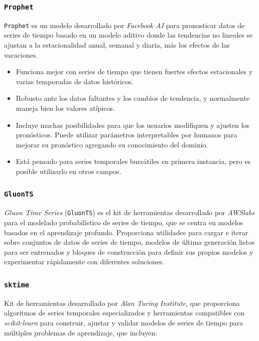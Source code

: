 \documentclass[a4paper,12pt]{article}
\begin{document}
\subsubsection{\texttt{Prophet}}
\texttt{Prophet} es un modelo desarrollado por \textit{Facebook AI} para pronosticar datos de series de tiempo basado en un modelo aditivo donde las tendencias no lineales se ajustan a la estacionalidad anual, semanal y diaria, más los efectos de las vacaciones. \citep{prophet}

\begin{itemize}
	\item Funciona mejor con series de tiempo que tienen fuertes efectos estacionales y varias temporadas de datos históricos.
	\item Robusto ante los datos faltantes y los cambios de tendencia, y normalmente maneja bien los valores atípicos.
	\item Incluye muchas posibilidades para que los usuarios modifiquen y ajusten los pronósticos. Puede utilizar parámetros interpretables por humanos para mejorar su pronóstico agregando su conocimiento del dominio.
	\item Está pensado para series temporales bursátiles en primera instancia, pero es posible utilizarlo en otros campos.
\end{itemize}

\subsubsection{\texttt{GluonTS}}
\textit{Gluon Time Series} (\texttt{GluonTS}) es el kit de herramientas desarrollado por \textit{AWSlabs} para el modelado probabilístico de series de tiempo, que se centra en modelos basados ​​en el aprendizaje profundo. Proporciona utilidades para cargar e iterar sobre conjuntos de datos de series de tiempo, modelos de última generación listos para ser entrenados y bloques de construcción para definir sus propios modelos y experimentar rápidamente con diferentes soluciones. \citep{gluonts}

\subsubsection{\texttt{sktime}}
Kit de herramientas desarrollado por \textit{Alan Turing Institute}, que proporciona algoritmos de series temporales especializados y herramientas compatibles con \textit{scikit-learn} para construir, ajustar y validar modelos de series de tiempo para múltiples problemas de aprendizaje, que incluyen: \citep{sktime}
\end{document}
